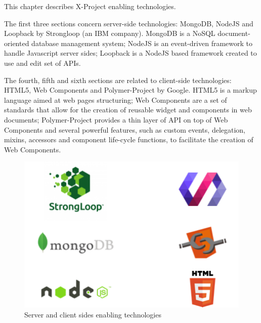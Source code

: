 This chapter describes X-Project enabling technologies.

The first three sections concern server-side technologies: MongoDB, NodeJS and Loopback by Strongloop (an IBM company).
MongoDB is a NoSQL document-oriented database management system; NodeJS is an event-driven framework to handle Javascript server sides; Loopback is a NodeJS based framework created to use and edit set of APIs.

The fourth, fifth and sixth sections are related to client-side technologies: HTML5, Web Components and Polymer-Project by Google.
HTML5 is a markup language aimed at web pages structuring; Web Components are a set of standards that allow for the creation of reusable widget and components in web documents; Polymer-Project provides a thin layer of API on top of Web Components and several powerful features, such as custom events, delegation, mixins, accessors and component life-cycle functions, to facilitate the creation of Web Components.

\begin {figure}[h]
\graphicspath{{images/chapter_TCH/}}
\includegraphics[width=\textwidth]{stack_tch}
\caption{Server and client sides enabling technologies}
\end {figure}
